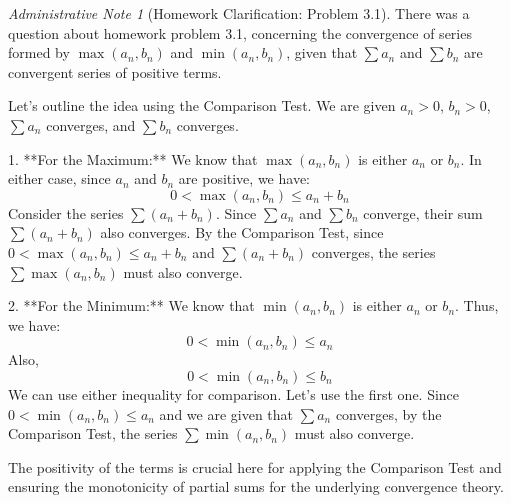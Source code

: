 \documentclass[11pt]{article}
\theoremstyle{plain}
\theoremstyle{definition}
\theoremstyle{remark}
\theoremstyle{adminstyle}
\newtheorem{adminnote}{Administrative Note}
\begin{document}
\begin{adminnote}[Homework Clarification: Problem 3.1]
There was a question about homework problem 3.1, concerning the convergence of series formed by $\max(a_n, b_n)$ and $\min(a_n, b_n)$, given that $\sum a_n$ and $\sum b_n$ are convergent series of positive terms.

Let's outline the idea using the Comparison Test.
We are given $a_n > 0$, $b_n > 0$, $\sum a_n$ converges, and $\sum b_n$ converges.

1.  **For the Maximum:**
    We know that $\max(a_n, b_n)$ is either $a_n$ or $b_n$. In either case, since $a_n$ and $b_n$ are positive, we have:
    \[ 0 < \max(a_n, b_n) \le a_n + b_n \]
    Consider the series $\sum (a_n + b_n)$. Since $\sum a_n$ and $\sum b_n$ converge, their sum $\sum (a_n + b_n)$ also converges.
    By the Comparison Test, since $0 < \max(a_n, b_n) \le a_n + b_n$ and $\sum (a_n + b_n)$ converges, the series $\sum \max(a_n, b_n)$ must also converge.

2.  **For the Minimum:**
    We know that $\min(a_n, b_n)$ is either $a_n$ or $b_n$. Thus, we have:
    \[ 0 < \min(a_n, b_n) \le a_n \]
    Also,
    \[ 0 < \min(a_n, b_n) \le b_n \]
    We can use either inequality for comparison. Let's use the first one.
    Since $0 < \min(a_n, b_n) \le a_n$ and we are given that $\sum a_n$ converges, by the Comparison Test, the series $\sum \min(a_n, b_n)$ must also converge.

The positivity of the terms is crucial here for applying the Comparison Test and ensuring the monotonicity of partial sums for the underlying convergence theory.
\end{adminnote}
\end{document}
